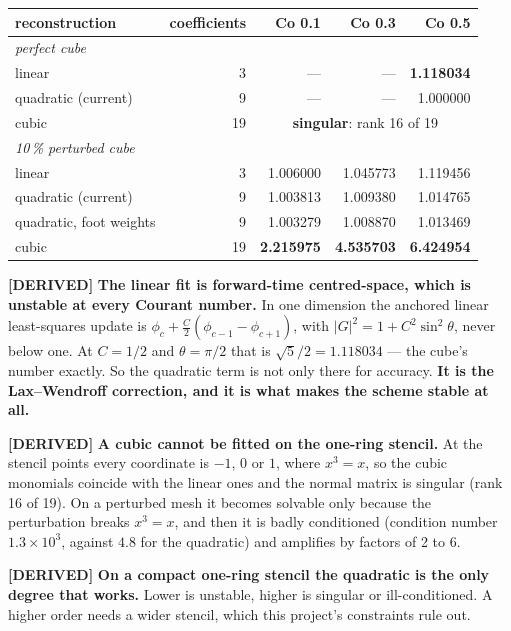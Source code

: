 \documentclass[11pt,a4paper]{article}
\newcommand{\derived}{\textcolor{blue!50!black}{\textbf{[DERIVED]}}}
\begin{document}
\begin{center}
\begin{tabular}{lrrrr}
\toprule
reconstruction & coefficients & Co 0.1 & Co 0.3 & Co 0.5 \\
\midrule
\multicolumn{5}{l}{\emph{perfect cube}} \\
linear                    & 3  & --- & --- & \textbf{1.118034} \\
quadratic (current)       & 9  & --- & --- & 1.000000 \\
cubic                     & 19 & \multicolumn{3}{c}{\textbf{singular}: rank 16 of 19} \\
\midrule
\multicolumn{5}{l}{\emph{10\,\% perturbed cube}} \\
linear                    & 3  & 1.006000 & 1.045773 & 1.119456 \\
quadratic (current)       & 9  & 1.003813 & 1.009380 & 1.014765 \\
quadratic, foot weights   & 9  & 1.003279 & 1.008870 & 1.013469 \\
cubic                     & 19 & \textbf{2.215975} & \textbf{4.535703} & \textbf{6.424954} \\
\bottomrule
\end{tabular}
\end{center}

\derived{} \textbf{The linear fit is forward-time centred-space, which is unstable at every
Courant number.} In one dimension the anchored linear least-squares update is
\(\phi_c + \tfrac{C}{2}(\phi_{c-1} - \phi_{c+1})\), with \(|G|^2 = 1 + C^2\sin^2\theta\), never
below one. At \(C = 1/2\) and \(\theta = \pi/2\) that is \(\sqrt5/2 = 1.118034\) --- the cube's
number exactly. So the quadratic term is not only there for accuracy. \textbf{It is the
Lax--Wendroff correction, and it is what makes the scheme stable at all.}

\derived{} \textbf{A cubic cannot be fitted on the one-ring stencil.} At the stencil points every
coordinate is \(-1\), \(0\) or \(1\), where \(x^3 = x\), so the cubic monomials coincide with the
linear ones and the normal matrix is singular (rank 16 of 19). On a perturbed mesh it becomes
solvable only because the perturbation breaks \(x^3 = x\), and then it is badly conditioned
(condition number \(1.3\times10^{3}\), against \(4.8\) for the quadratic) and amplifies by factors
of 2 to 6.

\derived{} \textbf{On a compact one-ring stencil the quadratic is the only degree that works.}
Lower is unstable, higher is singular or ill-conditioned. A higher order needs a wider stencil,
which this project's constraints rule out.
\end{document}
